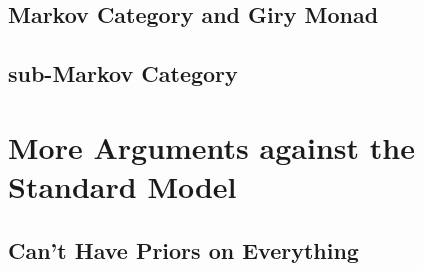\documentclass{article}
\begin{document}
	\subsection{Markov Category and Giry Monad}
	
	\subsection{sub-Markov Category}
	
	\section{More Arguments against the Standard Model} %
	
	\subsection{Can't Have Priors on Everything}\label{sec:impossible-prior}
	
	
		
	
	
\end{document}
